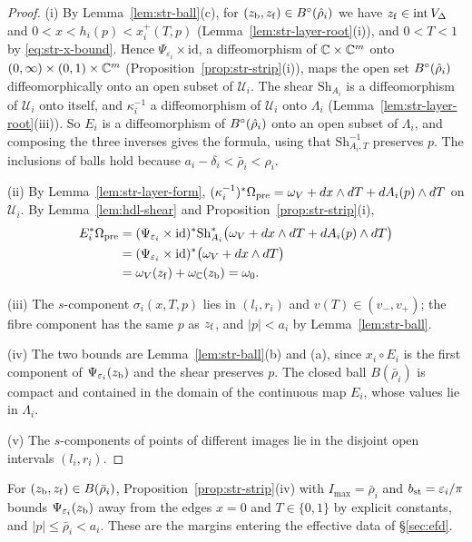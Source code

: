 \begin{proof}
(i) By Lemma~\ref{lem:str-ball}(c), for $(z_{\rm b},z_{\rm f})\in B^{\circ}(\hat\rho_i)$ we have $z_{\rm f}\in\operatorname{int}V_\Delta$ and
$0<x<h_i(p)<x_i^+(T,p)$ (Lemma~\ref{lem:str-layer-root}(i)), and $0<T<1$ by \eqref{eq:str-x-bound}. Hence
$\Psi_{\varepsilon_i}\times\mathrm{id}$, a diffeomorphism of $\mathbb{C}\times\mathbb{C}^m$ onto $(0,\infty)\times(0,1)\times\mathbb{C}^m$
(Proposition~\ref{prop:str-strip}(i)), maps the open set $B^{\circ}(\hat\rho_i)$ diffeomorphically onto an open subset of
$\mathcal U_i$. The shear $\mathrm{Sh}_{A_i}$ is a diffeomorphism of $\mathcal U_i$ onto itself, and $\kappa_i^{-1}$ a diffeomorphism
of $\mathcal U_i$ onto $\Lambda_i$ (Lemma~\ref{lem:str-layer-root}(iii)). So $E_i$ is a diffeomorphism of $B^{\circ}(\hat\rho_i)$ onto
an open subset of $\Lambda_i$, and composing the three inverses gives the formula, using that $\mathrm{Sh}_{A_i,T}^{-1}$ preserves $p$.
The inclusions of balls hold because $a_i-\delta_i<\bar\rho_i<\hat\rho_i$.

(ii) By Lemma~\ref{lem:str-layer-form}, $(\kappa_i^{-1})^*\Omega_{\rm pre}=\omega_V+dx\wedge dT+dA_i(p)\wedge dT$ on $\mathcal U_i$.
By Lemma~\ref{lem:hdl-shear} and Proposition~\ref{prop:str-strip}(i),
\begin{align*}
 E_i^*\Omega_{\rm pre}
 &=(\Psi_{\varepsilon_i}\times\mathrm{id})^*\mathrm{Sh}_{A_i}^*
      \big(\omega_V+dx\wedge dT+dA_i(p)\wedge dT\big)\\
 &=(\Psi_{\varepsilon_i}\times\mathrm{id})^*\big(\omega_V+dx\wedge dT\big)\\
 &=\omega_V(z_{\rm f})+\omega_{\mathbb{C}}(z_{\rm b})=\omega_0 .
\end{align*}

(iii) The $s$-component $\sigma_i(x,T,p)$ lies in $(l_i,r_i)$ and $v(T)\in(v_-,v_+)$; the fibre component has the same $p$ as
$z_{\rm f}$, and $|p|<a_i$ by Lemma~\ref{lem:str-ball}.

(iv) The two bounds are Lemma~\ref{lem:str-ball}(b) and (a), since $x_i\circ E_i$ is the first component of
$\Psi_{\varepsilon_i}(z_{\rm b})$ and the shear preserves $p$. The closed ball $B(\bar\rho_i)$ is compact and contained in the domain of
the continuous map $E_i$, whose values lie in $\Lambda_i$.

(v) The $s$-components of points of different images lie in the disjoint open intervals $(l_i,r_i)$.
\end{proof}

For $(z_{\rm b},z_{\rm f})\in B(\bar\rho_i)$, Proposition~\ref{prop:str-strip}(iv) with $I_{\max}=\bar\rho_i$ and
$b_{\rm st}=\varepsilon_i/\pi$ bounds $\Psi_{\varepsilon_i}(z_{\rm b})$ away from the edges $x=0$ and $T\in\{0,1\}$ by explicit constants, and
$|p|\le\bar\rho_i<a_i$. These are the margins entering the effective data of \S\ref{sec:efd}.


